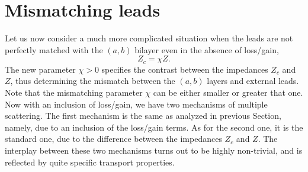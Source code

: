 \documentclass[aps,pra,reprint,showpacs,bibnotes,preprintnumbers,twoside,eqsecnum]{revtex4-1}
\begin{document}
\section{Mismatching leads}

Let us now consider a much more complicated situation when the leads are not perfectly matched with the $(a,b)$ bilayer even in the absence of loss/gain,
%
\begin{equation}\label{eq:MLBLG-def}
Z_c=\chi Z.
\end{equation}
The new parameter $\chi>0$ specifies the contrast between the impedances $Z_c$ and $Z$, thus determining the mismatch between the $(a,b)$ layers and external leads. Note that the mismatching parameter $\chi$ can be either smaller or greater that one. Now with an inclusion of loss/gain, we have two mechanisms of multiple scattering. The first mechanism is the same as analyzed in previous Section, namely, due to an inclusion of the loss/gain terms. As for the second one, it is the standard one, due to the difference between the impedances $Z_c$ and $Z$. The interplay between these two mechanisms turns out to be highly non-trivial, and is reflected by quite specific transport properties.
\end{document}
